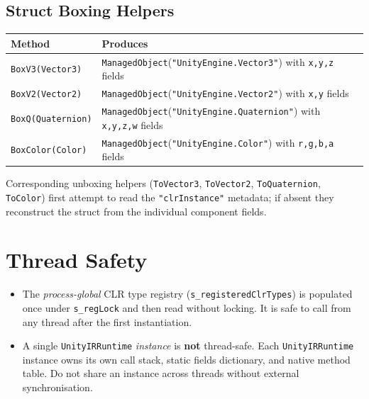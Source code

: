 \documentclass[11pt,a4paper]{article}
\newcommand{\code}[1]{\texttt{\small #1}}
\newcommand{\typename}[1]{\textcolor{typecolor}{\texttt{\small #1}}}
\begin{document}
\subsection{Struct Boxing Helpers}

\begin{longtable}{ll}
  \toprule
  \textbf{Method} & \textbf{Produces} \\
  \midrule
  \code{BoxV3(Vector3)}     & \typename{ManagedObject}(\code{"UnityEngine.Vector3"}) with
                              \code{x,y,z} fields \\
  \code{BoxV2(Vector2)}     & \typename{ManagedObject}(\code{"UnityEngine.Vector2"}) with
                              \code{x,y} fields \\
  \code{BoxQ(Quaternion)}   & \typename{ManagedObject}(\code{"UnityEngine.Quaternion"})
                              with \code{x,y,z,w} fields \\
  \code{BoxColor(Color)}    & \typename{ManagedObject}(\code{"UnityEngine.Color"}) with
                              \code{r,g,b,a} fields \\
  \bottomrule
\end{longtable}

Corresponding unboxing helpers (\code{ToVector3}, \code{ToVector2},
\code{ToQuaternion}, \code{ToColor}) first attempt to read the \code{"clrInstance"}
metadata; if absent they reconstruct the struct from the individual component fields.

\section{Thread Safety}

\begin{itemize}[leftmargin=1.5em]
  \item The \emph{process-global} CLR type registry (\code{s\_registeredClrTypes})
        is populated once under \code{s\_regLock} and then read without locking.
        It is safe to call from any thread after the first instantiation.
  \item A single \typename{UnityIRRuntime} \emph{instance} is \textbf{not}
        thread-safe. Each \typename{UnityIRRuntime} instance owns its own call stack,
        static fields dictionary, and native method table. Do not share an instance
        across threads without external synchronisation.
\end{itemize}
\end{document}

